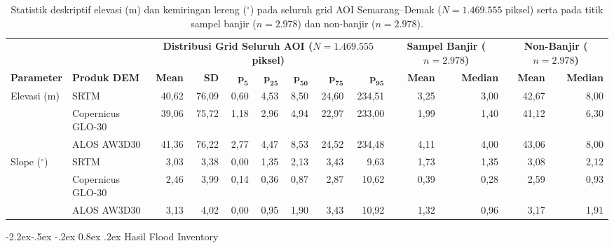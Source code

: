 \documentclass[12pt,a4paper]{article}
\makeatletter
\renewcommand\subsection{\@startsection{subsection}{2}{\z@}%
  {-2.2ex\@plus -.5ex \@minus -.2ex}%
  {0.8ex \@plus .2ex}%
  {\normalfont\normalsize\bfseries}}
\newenvironment{adjustbox}[1]{%
  \begin{lrbox}{\adjboxtemp}%
}{%
  \end{lrbox}%
  \ifdim\wd\adjboxtemp>\textwidth
    \resizebox{\textwidth}{!}{\usebox{\adjboxtemp}}%
  \else
    \usebox{\adjboxtemp}%
  \fi
}
\makeatother
\begin{document}
\begin{table}[!htbp]
\small
\centering
\caption[Statistik deskriptif elevasi dan kemiringan lereng]{Statistik deskriptif elevasi (m) dan kemiringan lereng ($^\circ$) pada seluruh grid AOI Semarang--Demak ($N = 1.469.555$ piksel) serta pada titik sampel banjir ($n=2.978$) dan non-banjir ($n=2.978$).}
\label{tab:dem-stats}
\begin{adjustbox}{max width=\textwidth}
\begin{tabular}{ll rrrrrrr rr rr}
\toprule
& & \multicolumn{7}{c}{\textbf{Distribusi Grid Seluruh AOI ($N = 1.469.555$ piksel)}} & \multicolumn{2}{c}{\textbf{Sampel Banjir ($n=2.978$)}} & \multicolumn{2}{c}{\textbf{Non-Banjir ($n=2.978$)}} \\
\cmidrule(lr){3-9} \cmidrule(lr){10-11} \cmidrule(lr){12-13}
\textbf{Parameter} & \textbf{Produk DEM} & \textbf{Mean} & \textbf{SD} & $\boldsymbol{p_5}$ & $\boldsymbol{p_{25}}$ & $\boldsymbol{p_{50}}$ & $\boldsymbol{p_{75}}$ & $\boldsymbol{p_{95}}$ & \textbf{Mean} & \textbf{Median} & \textbf{Mean} & \textbf{Median} \\
\midrule
Elevasi (m) & SRTM & 40,62 & 76,09 & 0,60 & 4,53 & 8,50 & 24,60 & 234,51 & 3,25 & 3,00 & 42,67 & 8,00 \\
            & Copernicus GLO-30 & 39,06 & 75,72 & 1,18 & 2,96 & 4,94 & 22,97 & 233,00 & 1,99 & 1,40 & 41,12 & 6,30 \\
            & ALOS AW3D30 & 41,36 & 76,22 & 2,77 & 4,47 & 8,53 & 24,52 & 234,48 & 4,11 & 4,00 & 43,06 & 8,00 \\
\midrule
Slope ($^\circ$) & SRTM & 3,03 & 3,38 & 0,00 & 1,35 & 2,13 & 3,43 & 9,63 & 1,73 & 1,35 & 3,08 & 2,12 \\
                 & Copernicus GLO-30 & 2,46 & 3,99 & 0,14 & 0,36 & 0,87 & 2,87 & 10,62 & 0,39 & 0,28 & 2,59 & 0,93 \\
                 & ALOS AW3D30 & 3,13 & 4,02 & 0,00 & 0,95 & 1,90 & 3,43 & 10,92 & 1,32 & 0,96 & 3,17 & 1,91 \\
\bottomrule
\end{tabular}
\end{adjustbox}
\end{table}

\subsection{Hasil Flood Inventory}
\end{document}
